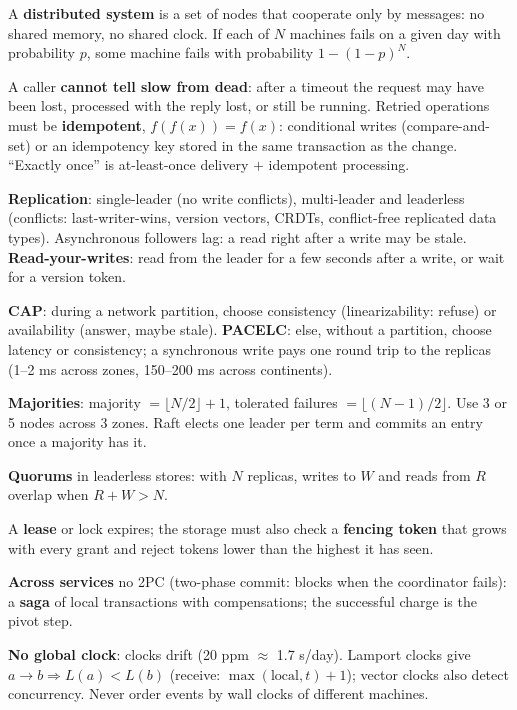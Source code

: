 \stages{\stDesign\ \stDeep}

\begin{know}
  \item A \textbf{distributed system} is a set of nodes that cooperate only by messages: no shared memory, no shared clock. If each of $N$ machines fails on a given day with probability $p$, some machine fails with probability $1 - (1-p)^N$.
  \item A caller \textbf{cannot tell slow from dead}: after a timeout the request may have been lost, processed with the reply lost, or still be running. Retried operations must be \textbf{idempotent}, $f(f(x)) = f(x)$: conditional writes (compare-and-set) or an idempotency key stored in the same transaction as the change. ``Exactly once'' is at-least-once delivery $+$ idempotent processing.
  \item \textbf{Replication}: single-leader (no write conflicts), multi-leader and leaderless (conflicts: last-writer-wins, version vectors, CRDTs, conflict-free replicated data types). Asynchronous followers lag: a read right after a write may be stale. \textbf{Read-your-writes}: read from the leader for a few seconds after a write, or wait for a version token.
  \item \textbf{CAP}: during a network partition, choose consistency (linearizability: refuse) or availability (answer, maybe stale). \textbf{PACELC}: else, without a partition, choose latency or consistency; a synchronous write pays one round trip to the replicas (1--2 ms across zones, 150--200 ms across continents).
  \item \textbf{Majorities}: majority $= \lfloor N/2 \rfloor + 1$, tolerated failures $= \lfloor (N-1)/2 \rfloor$. Use 3 or 5 nodes across 3 zones. Raft elects one leader per term and commits an entry once a majority has it.
  \item \textbf{Quorums} in leaderless stores: with $N$ replicas, writes to $W$ and reads from $R$ overlap when $R + W > N$.
  \item A \textbf{lease} or lock expires; the storage must also check a \textbf{fencing token} that grows with every grant and reject tokens lower than the highest it has seen.
  \item \textbf{Across services} no 2PC (two-phase commit: blocks when the coordinator fails): a \textbf{saga} of local transactions with compensations; the successful charge is the pivot step.
  \item \textbf{No global clock}: clocks drift (20 ppm $\approx$ 1.7 s/day). Lamport clocks give $a \to b \Rightarrow L(a) < L(b)$ (receive: $\max(\text{local}, t) + 1$); vector clocks also detect concurrency. Never order events by wall clocks of different machines.
\end{know}


